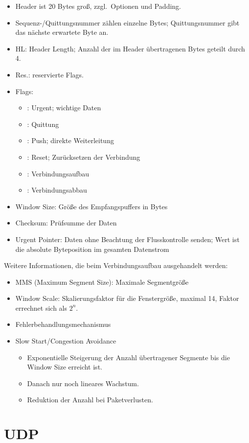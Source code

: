 \begin{itemize}
	\item Header ist 20 Bytes groß, zzgl.~Optionen und Padding.
	\item Sequenz-/Quittungsnummer zählen einzelne Bytes; Quittungsnummer gibt das nächste erwartete Byte an.
	\item HL: Header Length; Anzahl der im Header übertragenen Bytes geteilt durch 4.
	\item Res.: reservierte Flags.
	\item Flags:
	\begin{itemize}
		\item {}: Urgent; wichtige Daten
		\item {}: Quittung
		\item {}: Push; direkte Weiterleitung
		\item {}: Reset; Zurücksetzen der Verbindung
		\item {}: Verbindungsaufbau
		\item {}: Verbindungsabbau
	\end{itemize}
	\item Window Size: Größe des Empfangspuffers in Bytes
	\item Checksum: Prüfsumme der Daten
	\item Urgent Pointer: Daten ohne Beachtung der Flusskontrolle senden; Wert ist die absolute Byteposition im gesamten Datenstrom
\end{itemize}
Weitere Informationen, die beim Verbindungsaufbau ausgehandelt werden:
\begin{itemize}
	\item MMS (Maximum Segment Size): Maximale Segmentgröße
	\item Window Scale: Skalierungsfaktor für die Fenstergröße, maximal 14, Faktor errechnet sich als $2^n$.
	\item Fehlerbehandlungsmechanismus
	\item Slow Start/Congestion Avoidance
	\begin{itemize}
		\item Exponentielle Steigerung der Anzahl übertragener Segmente bis die Window Size erreicht ist.
		\item Danach nur noch lineares Wachstum.
		\item Reduktion der Anzahl bei Paketverlusten.
	\end{itemize}
\end{itemize}

\section{UDP}

